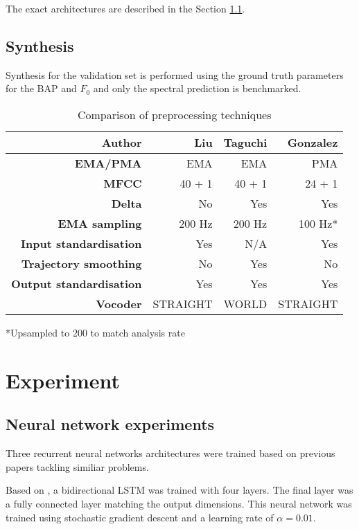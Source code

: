 \documentclass[a4paper]{article}
\begin{document}
The exact architectures are described in the Section \ref{nnexperiment}.

\subsection{Synthesis}

Synthesis for the validation set is performed using the ground truth
parameters for the BAP and $ F_0 $ and only the spectral prediction is
benchmarked.

\begin{table}[th]
  \caption{Comparison of preprocessing techniques}
  \label{tab:example}
  \centering
  \footnotesize
  \begin{tabular}{ r r r r }
    \toprule
    \textbf{Author} & \textbf{Liu} & \textbf{Taguchi} & \textbf{Gonzalez} \\
    \midrule
    \textbf{EMA/PMA} & EMA & EMA & PMA \\
    \textbf{MFCC} & 40 + 1 & 40 + 1 & 24 + 1 \\
    \textbf{Delta} & No & Yes & Yes \\
    \textbf{EMA sampling} & 200 Hz & 200 Hz & 100 Hz* \\
    \textbf{Input standardisation} & Yes & N/A  & Yes \\
    \textbf{Trajectory smoothing} & No & Yes  & No \\
    \textbf{Output standardisation} & Yes & Yes & Yes \\
    \textbf{Vocoder} & STRAIGHT & WORLD  & STRAIGHT \\
    \bottomrule
    
  \end{tabular}
  *Upsampled to 200 to match analysis rate
\end{table}

\section{Experiment}

\subsection{Neural network experiments} \label{nnexperiment}

Three recurrent neural networks architectures were trained based on previous
papers tackling similiar problems.

Based on \cite{Liu2018}, a bidirectional LSTM was trained with four layers.
The final layer was a fully connected layer matching the output dimensions.
This neural network was trained using stochastic gradient descent and
a learning rate of \( \alpha = 0.01 \).
\end{document}
